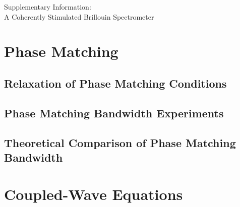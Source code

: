 \documentclass[
sn-nature,
twocolumn
]{sn-jnl}%
\begin{document}
\begin{appendices}
\onecolumn

\newpage
\begin{titlepage}
\centering
{}
{\Large Supplementary Information:\\[10pt] A Coherently Stimulated Brillouin Spectrometer\par}
\end{titlepage}

\tableofcontents
{} %

\newpage

\section{Phase Matching}
\subsection{Relaxation of Phase Matching Conditions}
\subsection{Phase Matching Bandwidth Experiments}
\subsection{Theoretical Comparison of Phase Matching Bandwidth}

\section{Coupled-Wave Equations}\label{Coupled-Wave Equations}


\end{appendices}
\end{document}
